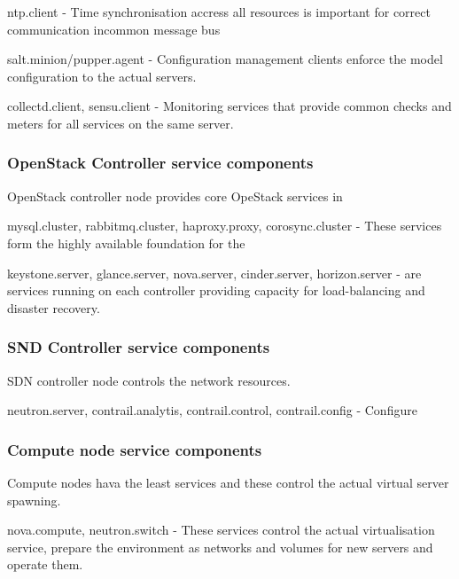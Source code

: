 ntp.client - Time synchronisation accress all resources is important for correct communication incommon message bus

salt.minion/pupper.agent - Configuration management clients enforce the model configuration to the actual servers.

collectd.client, sensu.client - Monitoring services that provide common checks and meters for all services on the same server.

\subsubsection{OpenStack Controller service components}

OpenStack controller node provides core OpeStack services in 

mysql.cluster, rabbitmq.cluster, haproxy.proxy, corosync.cluster - These services form the highly available foundation for the

keystone.server, glance.server, nova.server, cinder.server, horizon.server - are services running on each controller providing capacity for load-balancing and disaster recovery.

\subsubsection{SND Controller service components}

SDN controller node controls the network resources.

neutron.server, contrail.analytis, contrail.control, contrail.config - Configure

\subsubsection{Compute node service components}

Compute nodes hava the least services and these control the actual virtual server spawning.

nova.compute, neutron.switch - These services control the actual virtualisation service, prepare the environment as networks and volumes for new servers and operate them.
